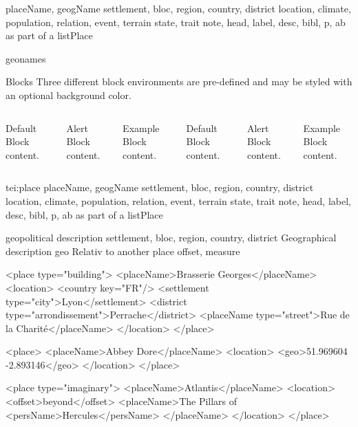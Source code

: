 placeName, geogName 
settlement, bloc, region, country, district 
location, climate, population, relation, event, terrain 
state, trait
note, head, label, desc, bibl, p, ab
as part of a listPlace

geonames 
\begin{frame}{Blocks}
  Three different block environments are pre-defined and may be styled with an
  optional background color.

  \begin{columns}[T,onlytextwidth]
      \begin{block}{Default}
        Block content.
      \end{block}

      \begin{alertblock}{Alert}
        Block content.
      \end{alertblock}

      \begin{exampleblock}{Example}
        Block content.
      \end{exampleblock}



      \begin{block}{Default}
        Block content.
      \end{block}

      \begin{alertblock}{Alert}
        Block content.
      \end{alertblock}

      \begin{exampleblock}{Example}
        Block content.
      \end{exampleblock}

  \end{columns}
\end{frame}
tei:place
placeName, geogName 
settlement, bloc, region, country, district 
location, climate, population, relation, event, terrain 
state, trait
note, head, label, desc, bibl, p, ab as part of a listPlace

geopolitical description
settlement, bloc, region, country, district
Geographical description
geo
Relativ to another place
offset, measure

\begin{xmlcode}
<place type="building">
 <placeName>Brasserie Georges</placeName>
 <location>
  <country key="FR"/>
  <settlement type="city">Lyon</settlement>
  <district type="arrondissement">Perrache</district>
  <placeName type="street">Rue de la Charité</placeName>
 </location>
</place>

<place>
  <placeName>Abbey Dore</placeName>
  <location>
    <geo>51.969604 -2.893146</geo>
  </location>
</place>

<place type="imaginary">
 <placeName>Atlantis</placeName>
 <location>
  <offset>beyond</offset>
  <placeName>The Pillars of <persName>Hercules</persName>
  </placeName>
 </location>
</place>
\end{xmlcode}


